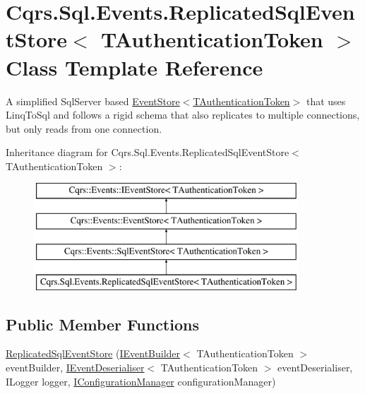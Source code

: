 \hypertarget{classCqrs_1_1Sql_1_1Events_1_1ReplicatedSqlEventStore}{}\section{Cqrs.\+Sql.\+Events.\+Replicated\+Sql\+Event\+Store$<$ T\+Authentication\+Token $>$ Class Template Reference}
\label{classCqrs_1_1Sql_1_1Events_1_1ReplicatedSqlEventStore}


A simplified Sql\+Server based \hyperlink{classCqrs_1_1Events_1_1EventStore_a6346cb2aea4c5b4e740dc6cfb15abab8}{Event\+Store$<$\+T\+Authentication\+Token$>$} that uses Linq\+To\+Sql and follows a rigid schema that also replicates to multiple connections, but only reads from one connection.  


Inheritance diagram for Cqrs.\+Sql.\+Events.\+Replicated\+Sql\+Event\+Store$<$ T\+Authentication\+Token $>$\+:\begin{figure}[H]
\begin{center}
\leavevmode
\includegraphics[height=4.000000cm]{classCqrs_1_1Sql_1_1Events_1_1ReplicatedSqlEventStore}
\end{center}
\end{figure}
\subsection*{Public Member Functions}
\begin{DoxyCompactItemize}
\item 
\hyperlink{classCqrs_1_1Sql_1_1Events_1_1ReplicatedSqlEventStore_aa00d17e2b147ebf7d2aff5ef1a543c07}{Replicated\+Sql\+Event\+Store} (\hyperlink{interfaceCqrs_1_1Events_1_1IEventBuilder}{I\+Event\+Builder}$<$ T\+Authentication\+Token $>$ event\+Builder, \hyperlink{interfaceCqrs_1_1Events_1_1IEventDeserialiser}{I\+Event\+Deserialiser}$<$ T\+Authentication\+Token $>$ event\+Deserialiser, I\+Logger logger, \hyperlink{interfaceCqrs_1_1Configuration_1_1IConfigurationManager}{I\+Configuration\+Manager} configuration\+Manager)
\end{DoxyCompactItemize}
